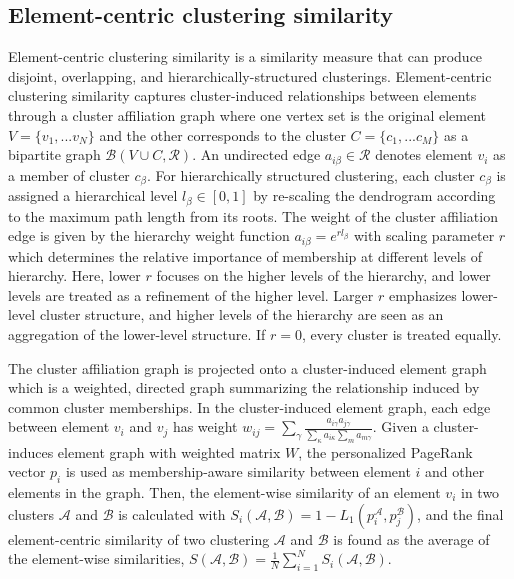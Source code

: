 \documentclass[12pt]{article} %
\begin{document}
\subsection*{Element-centric clustering similarity}

Element-centric clustering similarity \autocite{gates2019element} is a similarity measure that can produce disjoint, overlapping, and hierarchically-structured clusterings.
Element-centric clustering similarity captures cluster-induced relationships between elements through a cluster affiliation graph where one vertex set is the original element $V=\{v_1, ... v_N\}$ and the other corresponds to the cluster $C=\{c_1, ... c_M\}$ as a bipartite graph $\mathcal{B} (V \cup C, \mathcal{R})$.
An undirected edge $a_{i\beta} \in \mathcal{R}$ denotes element $v_i$ as a member of cluster $c_\beta$.
For hierarchically structured clustering, each cluster $c_\beta$ is assigned a hierarchical level $l_{\beta} \in [0,1]$ by re-scaling the dendrogram according to the maximum path length from its roots.
The weight of the cluster affiliation edge is given by the hierarchy weight function $a_{i\beta}  = e^{rl_{\beta}}$ with scaling parameter $r$ which determines the relative importance of membership at different levels of hierarchy.
Here, lower $r$ focuses on the higher levels of the hierarchy, and lower levels are treated as a refinement of the higher level.
Larger $r$ emphasizes lower-level cluster structure, and higher levels of the hierarchy are seen as an aggregation of the lower-level structure.
If $r=0$, every cluster is treated equally.

The cluster affiliation graph is projected onto a cluster-induced element graph which is a weighted, directed graph summarizing the relationship induced by common cluster memberships.
In the cluster-induced element graph, each edge  between element $v_i$ and $v_j$ has weight $w_{ij} = \sum_{\gamma} \frac{a_{i\gamma}a_{j\gamma}}{\sum_{\kappa}a_{i\kappa} {\sum_{m}a_{m\gamma}}}$.
Given a cluster-induces element graph with weighted matrix $W$, the personalized PageRank vector $p_i$  is used as membership-aware similarity between element $i$ and other elements in the graph.
Then, the element-wise similarity of an element $v_i$ in two clusters  $\mathcal{A}$ and $\mathcal{B}$ is calculated with $S_i(\mathcal{A}, \mathcal{B}) = 1 - L_1(p_i^{\mathcal{A}},p_j^{\mathcal{B}})$, and the final element-centric similarity of two clustering $\mathcal{A}$ and $\mathcal{B}$ is found as the average of the element-wise similarities, $S(\mathcal{A}, \mathcal{B}) =\frac{1}{N}\sum_{i=1}^{N} S_i(\mathcal{A}, \mathcal{B})$.
\end{document}
